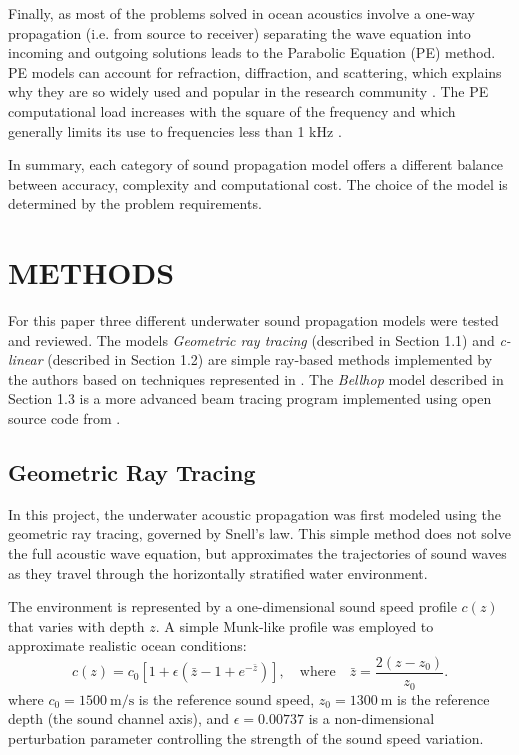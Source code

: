 \documentclass[fleqn]{jaes}
\begin{document}
Finally, as most of the problems solved in ocean acoustics involve a one-way propagation (i.e. from source to receiver) separating the wave equation into incoming and outgoing solutions leads to the
Parabolic Equation (PE) method. PE models can account for refraction, diffraction, and scattering, which explains why they are so widely used and popular in the research community \cite{Jensen}. The PE computational
load increases with the square of the frequency and which generally limits its use to frequencies less than 1 kHz \cite{propagationmodels}.

In summary, each category of sound propagation model offers a different balance between accuracy, complexity and computational cost. The choice of the model is determined by the problem requirements.

\section{METHODS}
For this paper three different underwater sound propagation models were tested and reviewed. The models \textit{Geometric ray tracing} (described in Section 1.1) and \textit{c-linear} (described in Section 1.2) are simple ray-based methods implemented by the authors based on techniques represented in \cite{Jensen}. The \textit{Bellhop} model described in Section 1.3 is a more advanced beam tracing program implemented using open source code from \cite{Porter}.

\subsection{Geometric Ray Tracing}
In this project, the underwater acoustic propagation was first modeled using the geometric ray tracing, governed by Snell’s law. This simple method does not solve the full acoustic wave equation, but approximates the trajectories of sound waves as they travel through the horizontally stratified water environment. 

The environment is represented by a one-dimensional sound speed profile $c(z)$ that varies with depth $z$. 
A simple Munk-like profile \cite{Porter} was employed to approximate realistic ocean conditions:
\begin{equation}
    c(z) = c_0 \left[ 1 + \epsilon \left( \bar{z} - 1 + e^{-\bar{z}} \right) \right],
    \quad \text{where} \quad
    \bar{z} = \frac{2(z - z_0)}{z_0}.
\end{equation}
where $c_0 = 1500~\text{m/s}$ is the reference sound speed, $z_0 = 1300~\text{m}$ is the reference depth (the sound channel axis), and $\epsilon = 0.00737$ is a non-dimensional perturbation parameter controlling the strength of the sound speed variation. 
\end{document}
